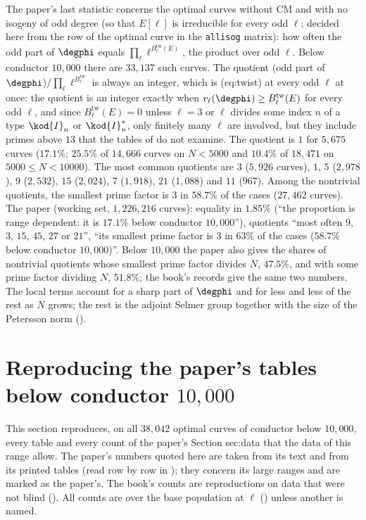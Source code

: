 \begin{sloppypar}
\begin{example}\label{ex:computation:odd-part}
The paper's last statistic concerns the optimal curves without CM and with no isogeny of odd degree (so that $E[\ell]$ is irreducible for every odd
$\ell$; decided here from the row of the optimal curve in the \texttt{allisog} matrix): how often the odd part of $\degphi$ equals $\prod_\ell\ell^{B^{\mathrm{tw}}_\ell(E)}$, the
product over odd $\ell$. Below conductor $10{,}000$ there are $33{,}137$ such curves. The quotient (odd part of $\degphi$)$/\prod_\ell\ell^{B^{\mathrm{tw}}_\ell}$ is always an
integer, which is (eq:twist) at every odd $\ell$ at once: the quotient is an integer exactly when $v_\ell(\degphi)\ge B^{\mathrm{tw}}_\ell(E)$ for every odd
$\ell$, and since $B^{\mathrm{tw}}_\ell(E)=0$ unless $\ell=3$ or $\ell$ divides some index $n$ of a type $\kod{I}_n$ or $\kod{I}_n^*$, only finitely many $\ell$ are
involved, but they include primes above $13$ that the tables of  do not examine. The quotient is $1$ for $5{,}675$ curves ($17.1\%$; $25.5\%$ of $14{,}666$ curves on $N<5000$ and $10.4\%$ of
$18{,}471$ on $5000\le N<10000$). The most common quotients are $3$ ($5{,}926$ curves), $1$, $5$ ($2{,}978$), $9$ ($2{,}532$), $15$ ($2{,}024$), $7$ ($1{,}918$), $21$
($1{,}088$) and $11$ ($967$). Among the nontrivial quotients, the smallest prime factor is $3$ in $58.7\%$ of the cases ($27{,}462$ curves). The paper (working
set, $1{,}226{,}216$ curves): equality in $1.85\%$ (``the proportion is range dependent: it is $17.1\%$ below conductor $10{,}000$''), quotients ``most often $9$, $3$,
$15$, $45$, $27$ or $21$'', ``its smallest prime factor is $3$ in $63\%$ of the cases ($58.7\%$ below conductor $10{,}000$)''. Below $10{,}000$ the paper
also gives the shares of nontrivial quotients whose smallest prime factor divides $N$, $47.5\%$, and with some prime factor dividing $N$, $51.8\%$; the
book's records give the same two numbers. The local terms account for a sharp part of $\degphi$ and for less and less of the rest as $N$ grows; the rest is the
adjoint Selmer group together with the size of the Petersson norm ().
\end{example}
\section{Reproducing the paper's tables below conductor \texorpdfstring{$10{,}000$}{10,000}}\label{sec:computation:repro}

This section reproduces, on all $38{,}042$ optimal curves of conductor below $10{,}000$, every table and every count of the paper's Section sec:data
that the data of this range allow. The paper's numbers quoted here are taken from its text and from its printed tables (read row by row in
); they concern its large ranges and are marked as the paper's. The book's counts are reproductions on data that were not
blind (). All counts are over the base population at $\ell$ () unless another is named.


\end{sloppypar}
